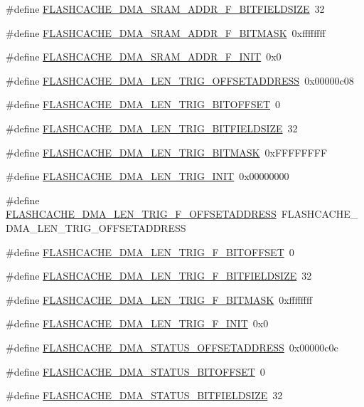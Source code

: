 \begin{DoxyCompactItemize}
\#define \hyperlink{a00550_aa3b697c27f4b7456043790ac61874e05}{FLASHCACHE\_\-DMA\_\-SRAM\_\-ADDR\_\-F\_\-BITFIELDSIZE}~32
\item 
\#define \hyperlink{a00550_ac4c5b63b57af92a114ce97d3bea43240}{FLASHCACHE\_\-DMA\_\-SRAM\_\-ADDR\_\-F\_\-BITMASK}~0xffffffff
\item 
\#define \hyperlink{a00550_a434783268a2d6abd0b0115408daba733}{FLASHCACHE\_\-DMA\_\-SRAM\_\-ADDR\_\-F\_\-INIT}~0x0
\item 
\#define \hyperlink{a00550_ae1bc2e4b7109f9b2681b16dd707d0ce3}{FLASHCACHE\_\-DMA\_\-LEN\_\-TRIG\_\-OFFSETADDRESS}~0x00000c08
\item 
\#define \hyperlink{a00550_a9d6f299949862ca4c1118d0e60830bdb}{FLASHCACHE\_\-DMA\_\-LEN\_\-TRIG\_\-BITOFFSET}~0
\item 
\#define \hyperlink{a00550_a0469ec6e5cc4b7c0b98aa298e43708df}{FLASHCACHE\_\-DMA\_\-LEN\_\-TRIG\_\-BITFIELDSIZE}~32
\item 
\#define \hyperlink{a00550_ac486cb35380d812b7071e6a1ae83967a}{FLASHCACHE\_\-DMA\_\-LEN\_\-TRIG\_\-BITMASK}~0xFFFFFFFF
\item 
\#define \hyperlink{a00550_acfcaa2a748a9d4f52518435df319e801}{FLASHCACHE\_\-DMA\_\-LEN\_\-TRIG\_\-INIT}~0x00000000
\item 
\#define \hyperlink{a00550_a202e8e436735d05415643356b5785e98}{FLASHCACHE\_\-DMA\_\-LEN\_\-TRIG\_\-F\_\-OFFSETADDRESS}~FLASHCACHE\_\-DMA\_\-LEN\_\-TRIG\_\-OFFSETADDRESS
\item 
\#define \hyperlink{a00550_a13d689e99cbd43a75a02b72cd7f3d82c}{FLASHCACHE\_\-DMA\_\-LEN\_\-TRIG\_\-F\_\-BITOFFSET}~0
\item 
\#define \hyperlink{a00550_a4c4e989c035c3ec7ff47129848aefe3d}{FLASHCACHE\_\-DMA\_\-LEN\_\-TRIG\_\-F\_\-BITFIELDSIZE}~32
\item 
\#define \hyperlink{a00550_a3546fba5e92fb9c2cf5ef876bc1c8b28}{FLASHCACHE\_\-DMA\_\-LEN\_\-TRIG\_\-F\_\-BITMASK}~0xffffffff
\item 
\#define \hyperlink{a00550_a7b18e894e9c79744bb2008d9c9540ab2}{FLASHCACHE\_\-DMA\_\-LEN\_\-TRIG\_\-F\_\-INIT}~0x0
\item 
\#define \hyperlink{a00550_a1ddacbd47c7fd9a28ab49130efdbb5dd}{FLASHCACHE\_\-DMA\_\-STATUS\_\-OFFSETADDRESS}~0x00000c0c
\item 
\#define \hyperlink{a00550_aee0ba5a56266b6f705c6291e49d6e6dc}{FLASHCACHE\_\-DMA\_\-STATUS\_\-BITOFFSET}~0
\item 
\#define \hyperlink{a00550_a495e246c0cd00c8748ebca6c452f8575}{FLASHCACHE\_\-DMA\_\-STATUS\_\-BITFIELDSIZE}~32

\end{DoxyCompactItemize}
